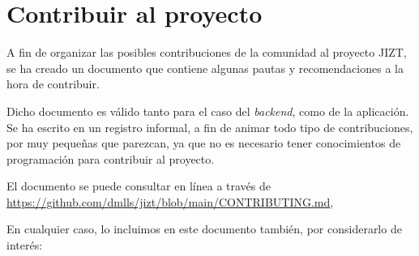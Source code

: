 \section{Contribuir al proyecto}

A fin de organizar las posibles contribuciones de la comunidad al proyecto JIZT, se ha creado un documento que contiene algunas pautas y recomendaciones a la hora de contribuir.

Dicho documento es válido tanto para el caso del \emph{backend}, como de la aplicación. Se ha escrito en un registro informal, a fin de animar todo tipo de contribuciones, por muy pequeñas que parezcan, ya que no es necesario tener conocimientos de programación para contribuir al proyecto.

El documento se puede consultar en línea a través de \href{https://github.com/dmlls/jizt/blob/main/CONTRIBUTING.md}{https://github.com/\newline dmlls/jizt/blob/main/CONTRIBUTING.md},

En cualquier caso, lo incluimos en este documento también, por considerarlo de interés:

